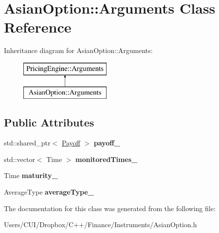 \hypertarget{class_asian_option_1_1_arguments}{}\section{Asian\+Option\+:\+:Arguments Class Reference}
\label{class_asian_option_1_1_arguments}
Inheritance diagram for Asian\+Option\+:\+:Arguments\+:\begin{figure}[H]
\begin{center}
\leavevmode
\includegraphics[height=2.000000cm]{class_asian_option_1_1_arguments}
\end{center}
\end{figure}
\subsection*{Public Attributes}
\begin{DoxyCompactItemize}
\item 
\hypertarget{class_asian_option_1_1_arguments_ae44f022e21c05aa688d1d94a0f57d125}{}\label{class_asian_option_1_1_arguments_ae44f022e21c05aa688d1d94a0f57d125} 
std\+::shared\+\_\+ptr$<$ \hyperlink{class_payoff}{Payoff} $>$ {\bfseries payoff\+\_\+}
\item 
\hypertarget{class_asian_option_1_1_arguments_a27e013476613aec57076742ba561a722}{}\label{class_asian_option_1_1_arguments_a27e013476613aec57076742ba561a722} 
std\+::vector$<$ Time $>$ {\bfseries monitored\+Times\+\_\+}
\item 
\hypertarget{class_asian_option_1_1_arguments_ad39a2dee07ec9ec77cb64cb75e44a056}{}\label{class_asian_option_1_1_arguments_ad39a2dee07ec9ec77cb64cb75e44a056} 
Time {\bfseries maturity\+\_\+}
\item 
\hypertarget{class_asian_option_1_1_arguments_aa93577b436b362136035ed3f6fc742bf}{}\label{class_asian_option_1_1_arguments_aa93577b436b362136035ed3f6fc742bf} 
Average\+Type {\bfseries average\+Type\+\_\+}
\end{DoxyCompactItemize}


The documentation for this class was generated from the following file\+:\begin{DoxyCompactItemize}
\item 
Users/\+C\+U\+I/\+Dropbox/\+C++/\+Finance/\+Instruments/Asian\+Option.\+h\end{DoxyCompactItemize}

